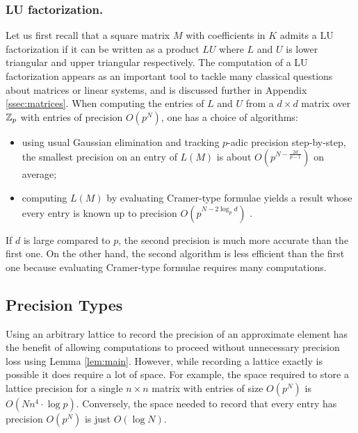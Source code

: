 \documentclass{lms}
\begin{document}
\subsubsection*{LU factorization.}

Let us first recall that a square matrix $M$ with coefficients in $K$ 
admits a LU factorization if it can be written as a product $LU$ where 
$L$ and $U$ is lower triangular and upper triangular respectively. 
The computation of a LU factorization appears as an important tool to 
tackle many classical questions about matrices or linear systems, and is
discussed further in Appendix \ref{ssec:matrices}.
When computing the entries of $L$ and $U$ from a $d \times d$ matrix
over $\mathbb Z_p$ with entries of precision $O(p^N)$, one has a choice of algorithms:
\begin{itemize}
\item using usual Gaussian elimination and tracking $p$-adic precision 
step-by-step, the smallest precision on an entry of $L(M)$ is about
$O(p^{N - \frac{2d}{p-1}})$ on average;
\item computing $L(M)$ by evaluating Cramer-type formulae yields a
result whose every entry is known up to precision $O(p^{N - 2 \log_p 
d})$ \cite{caruso:12a}.
\end{itemize}
If $d$ is large compared to $p$, the second precision is much more
accurate than the first one. On the other hand, the second algorithm
is less efficient than the first one because evaluating Cramer-type
formulae requires many computations. 

\subsection{Precision Types}

Using an arbitrary lattice to record the precision of an approximate 
element has the benefit of allowing computations to proceed without 
unnecessary precision loss using Lemma \ref{lem:main}.  However, while 
recording a lattice exactly is possible it does require a lot of space.  
For example, the space required to store a lattice precision for a 
single $n \times n$ matrix with entries of size $O(p^N)$ is $O(Nn^4 
\cdot \log p)$.  Conversely, the space needed to record that every entry 
has precision $O(p^N)$ is just $O(\log N)$.
\end{document}
